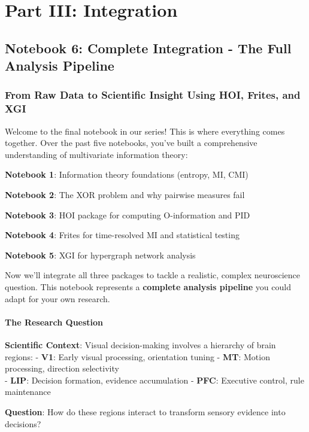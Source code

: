 \documentclass[
  11pt,
  letterpaper,
  oneside,
  openany]{book}
\begin{document}
\part{Part III: Integration}

\chapter{Notebook 6: Complete Integration - The Full Analysis
Pipeline}\label{notebook-6-complete-integration---the-full-analysis-pipeline}

\section{From Raw Data to Scientific Insight Using HOI, Frites, and
XGI}\label{from-raw-data-to-scientific-insight-using-hoi-frites-and-xgi}

Welcome to the final notebook in our series! This is where everything
comes together. Over the past five notebooks, you've built a
comprehensive understanding of multivariate information theory:

\textbf{Notebook 1}: Information theory foundations (entropy, MI, CMI)

\textbf{Notebook 2}: The XOR problem and why pairwise measures fail

\textbf{Notebook 3}: HOI package for computing O-information and PID

\textbf{Notebook 4}: Frites for time-resolved MI and statistical testing

\textbf{Notebook 5}: XGI for hypergraph network analysis

Now we'll integrate all three packages to tackle a realistic, complex
neuroscience question. This notebook represents a \textbf{complete
analysis pipeline} you could adapt for your own research.

\subsection{The Research Question}\label{the-research-question}

\textbf{Scientific Context}: Visual decision-making involves a hierarchy
of brain regions: - \textbf{V1}: Early visual processing, orientation
tuning - \textbf{MT}: Motion processing, direction selectivity\\
- \textbf{LIP}: Decision formation, evidence accumulation -
\textbf{PFC}: Executive control, rule maintenance

\textbf{Question}: How do these regions interact to transform sensory
evidence into decisions?
\end{document}
